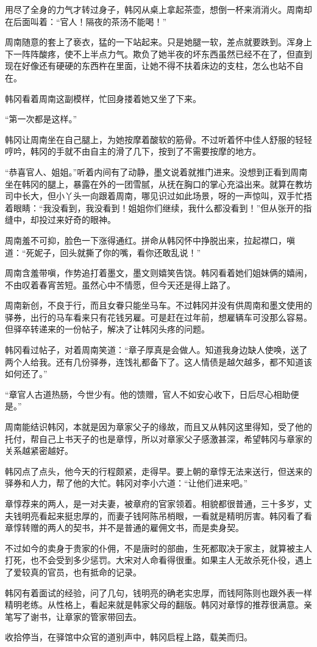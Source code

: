 用尽了全身的力气才转过身子，韩冈从桌上拿起茶壶，想倒一杯来消消火。周南却在后面叫着：“官人！隔夜的茶汤不能喝！”

周南随意的套上了亵衣，猛的一下站起来。只是她腿一软，差点就要跌到。浑身上下一阵阵酸疼，使不上半点力气。欺负了她半夜的坏东西虽然已经不在了，但直到现在好像还有硬硬的东西杵在里面，让她不得不扶着床边的支柱，怎么也站不自在。

韩冈看着周南这副模样，忙回身搂着她又坐了下来。

“第一次都是这样。”

韩冈让周南坐在自己腿上，为她按摩着酸软的筋骨。不过听着怀中佳人舒服的轻轻哼吟，韩冈的手就不由自主的滑了几下，按到了不需要按摩的地方。

“恭喜官人、姐姐。”听着内间有了动静，墨文说着就推门进来。没想到正看到周南坐在韩冈的腿上，暴露在外的一团雪腻，从抚在胸口的掌心充溢出来。就算在教坊司中长大，但小丫头一向跟着周南，哪见识过如此场景，呀的一声惊叫，双手忙捂着眼睛：“我没看到，我没看到！姐姐你们继续，我什么都没看到！”但从张开的指缝中，却投过来好奇的眼神。

周南羞不可抑，脸色一下涨得通红。拼命从韩冈怀中挣脱出来，拉起襟口，嗔道：“死妮子，回头就撕了你的嘴，看你还敢乱说！”

周南含羞带嗔，作势追打着墨文，墨文则嬉笑告饶。韩冈看着她们姐妹俩的嬉闹，不由叹着春宵苦短。虽然心中不情愿，但今天还是得上路了。

周南新创，不良于行，而且女眷只能坐马车。不过韩冈并没有供周南和墨文使用的驿券，出行的马车看来只有花钱另雇。可是赶在过年前，想雇辆车可没那么容易。但驿卒转递来的一份帖子，解决了让韩冈头疼的问题。

韩冈看过帖子，对着周南笑道：“章子厚真是会做人。知道我身边缺人使唤，送了两个人给我。还有几份驿券，连饯礼都备下了。这人情债是越欠越多，都不知道该如何还了。”

“章官人古道热肠，今世少有。他的馈赠，官人不如安心收下，日后尽心相助便是。”

周南能结识韩冈，本就是因为章家父子的缘故，而且又从韩冈这里得知，受了他的托付，帮自己上书天子的也是章惇，所以对章家父子感激甚深，希望韩冈与章家的关系越紧密越好。

韩冈点了点头，他今天的行程颇紧，走得早。要上朝的章惇无法来送行，但送来的驿券和人力，帮了他的大忙。韩冈对李小六道：“让他们进来吧。”

章惇荐来的两人，是一对夫妻，被章府的官家领着。相貌都很普通，三十多岁，丈夫钱明亮看起来挺忠厚的，而妻子钱阿陈吊梢眼，一看就是精明厉害。韩冈看了看章惇转赠的两人的契书，并不是普通的雇佣文书，而是卖身契。

不过如今的卖身于贵家的仆佣，不是唐时的部曲，生死都取决于家主，就算被主人打死，也不会受到多少惩罚。大宋对人命看得很重。如果主人无故杀死仆役，遇上了爱较真的官员，也有抵命的记录。

韩冈有着面试的经验，问了几句，钱明亮的确老实忠厚，而钱阿陈则也跟外表一样精明老练。从性格上，看起来就是韩家父母的翻版。韩冈对章惇的推荐很满意。亲笔写了谢书，让章家的管家带回去。

收拾停当，在驿馆中众官的道别声中，韩冈启程上路，载美而归。

